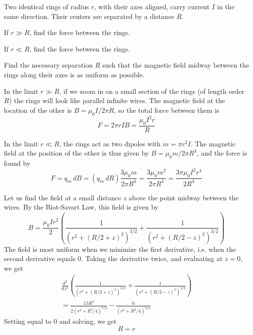 \documentclass[11pt]{scrartcl}
\begin{document}
\begin{prob}
    Two identical rings of radius $r$, with their axes aligned, carry current $I$ in the same direction. Their centers are separated by a distance $R$.
    \begin{anum}
        \item If $r\gg R$, find the force between the rings.
        \item If $r\ll R$, find the force between the rings.
        \item Find the necessary separation $R$ such that the magnetic field midway between the rings along their axes is as uniform as possible. 
    \end{anum}
\end{prob}

\begin{sol}
    \begin{anum}
        \item In the limit $r\gg R$, if we zoom in on a small section of the rings (of length order $R$) the rings will look like parallel infinite wires. The magnetic field at the location of the other is $B=\mu_0I/2\pi R$, so the total force between them is $$F=2\pi rIB=\boxed{\frac{\mu_0I^2r}{R}}$$
        \item In the limit $r\ll R$, the rings act as two dipoles with $m=\pi r^2I.$ The magnetic field at the position of the other is thus given by $B=\mu_0m/2\pi R^3$, and the force is found by $$F=q_m\, dB=(q_m\, dR)\frac{3\mu_0m}{2\pi R^4}=\frac{3\mu_0m^2}{2\pi R^4}=\boxed{\frac{3\pi \mu_0I^2r^4}{2R^4}}$$
        \item Let us find the field at a small distance $z$ above the point midway between the wires. By the Biot-Savart Law, this field is given by $$B=\frac{\mu_0Ir^2}{2}\left(\frac{1}{(r^2+(R/2+z)^2)^{3/2}}+\frac{1}{(r^2+(R/2-z)^2)^{3/2}}\right)$$The field is most uniform when we minimize the first derivative, i.e. when the second derivative equals 0. Taking the derivative twice, and evaluating at $z=0$, we get \begin{align*}\frac{d^2}{dz^2}\left(\frac{1}{(r^2+(R/2+z)^2)^{3/2}}+\frac{1}{(r^2+(R/2-z)^2)^{3/2}}\right)\\
        =\frac{15R^2}{2(r^2+R^2/4)^{7/2}}-\frac{6}{(r^2+R^2/4)^{5/2}}\end{align*}Setting equal to 0 and solving, we get $$\boxed{R=r}$$
    \end{anum}
\end{sol}
\end{document}
